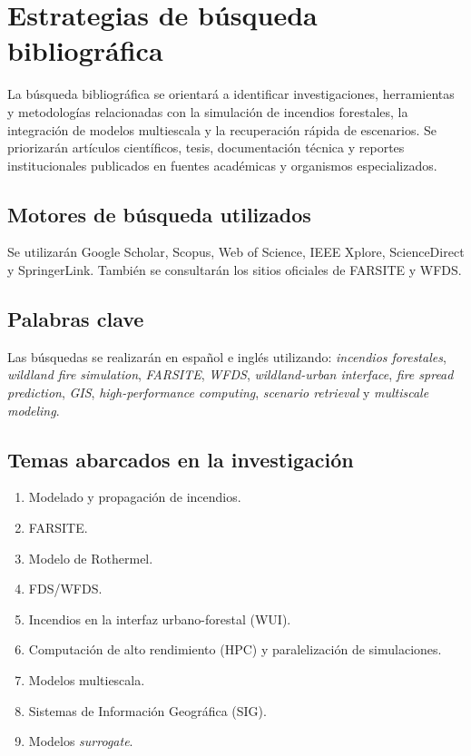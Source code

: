 \clearpage
\section{Estrategias de búsqueda bibliográfica}

La búsqueda bibliográfica se orientará a identificar investigaciones, herramientas y metodologías relacionadas con la simulación de incendios forestales, la integración de modelos multiescala y la recuperación rápida de escenarios. Se priorizarán artículos científicos, tesis, documentación técnica y reportes institucionales publicados en fuentes académicas y organismos especializados.

\subsection{Motores de búsqueda utilizados}

Se utilizarán Google Scholar, Scopus, Web of Science, IEEE Xplore, ScienceDirect y SpringerLink. También se consultarán los sitios oficiales de FARSITE y WFDS.

\subsection{Palabras clave}

Las búsquedas se realizarán en español e inglés utilizando: \textit{incendios forestales}, \textit{wildland fire simulation}, \textit{FARSITE}, \textit{WFDS}, \textit{wildland-urban interface}, \textit{fire spread prediction}, \textit{GIS}, \textit{high-performance computing}, \textit{scenario retrieval} y \textit{multiscale modeling}.

\subsection{Temas abarcados en la investigación}

\begin{enumerate}
    \item Modelado y propagación de incendios.
    \item FARSITE.
    \item Modelo de Rothermel.
    \item FDS/WFDS.
    \item Incendios en la interfaz urbano-forestal (WUI).
    \item Computación de alto rendimiento (HPC) y paralelización de simulaciones.
    \item Modelos multiescala.
    \item Sistemas de Información Geográfica (SIG).
    \item Modelos \textit{surrogate}.
\end{enumerate}

